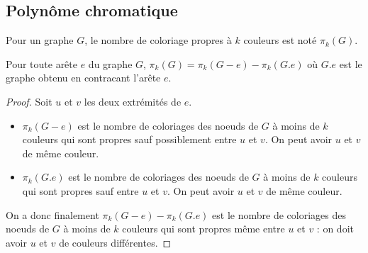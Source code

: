 \subsection{Polynôme chromatique}
Pour un graphe $G$, le nombre de coloriage propres à $k$ couleurs est noté $\pi_k(G)$.
\begin{mytheo}
  Pour toute arête $e$ du graphe $G$, $\pi_k(G) = \pi_k(G-e) - \pi_k(G.e)$ où $G.e$ est le graphe obtenu en contracant l'arête $e$.
  \begin{proof}
  Soit $u$ et $v$ les deux extrémités de $e$.
	\begin{itemize}
	\item $\pi_k(G-e)$ est le nombre de coloriages des noeuds de $G$ à moins de $k$ couleurs qui sont propres sauf possiblement entre $u$ et $v$. On peut avoir $u$ et $v$ de même couleur.
	\item $\pi_k(G.e)$ est le nombre de coloriages des noeuds de $G$ à moins de $k$ couleurs qui sont propres sauf entre $u$ et $v$. On peut avoir $u$ et $v$ de même couleur.
	\end{itemize}
	On a donc finalement $\pi_k(G-e) - \pi_k(G.e)$ est le nombre de coloriages des noeuds de $G$ à moins de $k$ couleurs qui sont propres même entre $u$ et $v$ : on doit avoir $u$ et $v$ de couleurs différentes.
  \end{proof}
\end{mytheo}
